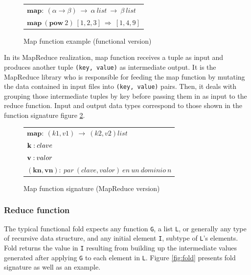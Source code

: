 \begin{figure}[tbp]
\begin{center}
\begin{tabular}{|l|}
\hline
$\mathbf{map:} \: \left ( \alpha \rightarrow \beta \right ) \: \rightarrow \: \alpha \: list \: \rightarrow \: \beta \: list$ \\
$\mathbf{map} \: \left( \mathbf{pow}\:2 \right) \: \left[ 1,2,3 \right] \: \Rightarrow \: \left[ 1,4,9 \right ]$ \\
\hline
\end{tabular}
\caption{Map function example (functional version)}
\label{fig:functionalmap}
\end{center}
\end{figure}

In its MapReduce realization, map function receives a tuple as input and produces another tuple \texttt{(key, value)} as intermediate output. It is the MapReduce library who is responsible for feeding the map function by mutating the data contained in input files into \texttt{(key, value)} pairs. Then, it deals with grouping those intermediate tuples by key before passing them in as input to the reduce function. Input and output data types correspond to those shown in the function signature figure \ref{fig:mapreducemap}.

\begin{figure}[tbp]
\begin{center}
\begin{tabular}{|l|}
\hline
$\mathbf{map:} \: \left( k1,v1 \right) \: \rightarrow \: \left( k2,v2 \right) list$ \\
$\mathbf{k:} \: clave \linebreak$ \\
$\mathbf{v:} \: valor \linebreak$ \\
$\mathbf{\left(kn,vn \right):} \: par \: \left( clave,valor \right) \: en \: un \: dominio \: n$ \\
\hline
\end{tabular}
\caption{Map function signature (MapReduce version)}
\label{fig:mapreducemap}
\end{center}
\end{figure}


\subsubsection{Reduce function}\label{reduce}

\noindent The typical functional fold expects any function \texttt{G}, a list \texttt{L}, or generally any type of recursive data structure, and any initial element \texttt{I}, subtype of \texttt{L}'s elements. Fold returns the value in \texttt{I} resulting from building up the intermediate values generated after applying \texttt{G} to each element in \texttt{L}. Figure \ref{fig:fold} presents fold signature as well as an example.

